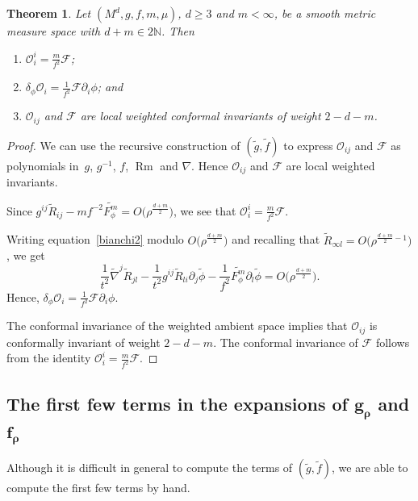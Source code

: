 \documentclass[10pt,a4paper]{amsart}
\numberwithin{equation}{section}
\newtheorem{Theorem}{Theorem}[section]
\begin{document}
\begin{Theorem}
\label{obstruction-theorem}
Let $(M^d,g,f,m,\mu)$, $d\geq 3$ and $m<\infty$, be a smooth metric measure space with $d+m\in 2\mathbb{N}$. Then
\begin{enumerate}[label=$(\roman*)$]\itemsep=0pt
\item $\mathcal{O}_i^i=\frac{m}{f^2}\mathcal{F}$;
\item $\delta_\phi\mathcal{O}_{i}=\frac{1}{f^2}\mathcal{F}\partial_i\phi$; and
\item $\mathcal{O}_{ij}$ and $\mathcal{F}$ are local weighted conformal invariants of weight $2-d-m$.
\end{enumerate}
\end{Theorem}

\begin{proof}
We can use the recursive construction of $(\widetilde{g},\widetilde{f})$ to express $\mathcal{O}_{ij}$ and $\mathcal{F}$ as polynomials in~$g$, $g^{-1}$, $f$, $\operatorname{Rm}$ and $\nabla$.
Hence $\mathcal{O}_{ij}$ and $\mathcal{F}$ are local weighted invariants.

Since $g^{ij}\widetilde{R}_{ij}-mf^{-2}\widetilde{F_\phi^m}=O\big(\rho^{\frac{d+m}{2}}\big)$, we see that $\mathcal{O}^i_i=\frac{m}{f^2}\mathcal{F}$.

Writing equation~\eqref{bianchi2} modulo $O\big(\rho^{\frac{d+m}{2}}\big)$ and recalling that $\widetilde{R}_{\infty l}=O\big(\rho^{\frac{d+m}{2}-1}\big)$, we get
\[
\frac{1}{t^2}\widetilde{\nabla}^j \widetilde{R}_{jl}-\frac{1}{t^2}g^{ij}\widetilde{R}_{li}\partial_j \widetilde{\phi}-\frac{1}{f^2}\widetilde{F_\phi^m}\partial_l \widetilde{\phi}=O\big(\rho^{\frac{d+m}{2}}\big).
\]
Hence, $\delta_\phi\mathcal{O}_{i}=\frac{1}{f^2}\mathcal{F}\partial_i\phi$.

The conformal invariance of the weighted ambient space implies that $\mathcal{O}_{ij}$ is conformally invari\-ant of weight $2-d-m$. The conformal invariance of $\mathcal{F}$ follows from the identity ${\mathcal{O}_i^i=\frac{m}{f^2}\mathcal{F}}$.
\end{proof}


\subsection[The first few terms in the expansions of g\_\{rho\} and f\_\{rho\}]{The first few terms in the expansions of $\boldsymbol{g_\rho}$ and $\boldsymbol {f_\rho}$}
\label{sec:low-order-expansion}

Although it is difficult in general to compute the terms of $(\widetilde{g},\widetilde{f})$, we are able to compute the first few terms by hand.
\end{document}
